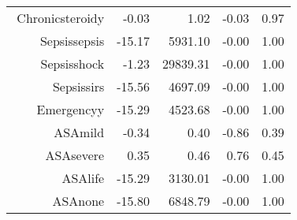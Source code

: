 \begin{tabular}{rrrrr}
$$  Chronic\-steroid\-y & -0.03 & 1.02 & -0.03 & 0.97 \\ 
  Sepsis\-sepsis & -15.17 & 5931.10 & -0.00 & 1.00 \\ 
  Sepsis\-shock & -1.23 & 29839.31 & -0.00 & 1.00 \\ 
  Sepsis\-sirs & -15.56 & 4697.09 & -0.00 & 1.00 \\ 
  Emergency\-y & -15.29 & 4523.68 & -0.00 & 1.00 \\ 
  ASA\-mild & -0.34 & 0.40 & -0.86 & 0.39 \\ 
  ASA\-severe & 0.35 & 0.46 & 0.76 & 0.45 \\ 
  ASA\-life & -15.29 & 3130.01 & -0.00 & 1.00 \\ 
  ASA\-none & -15.80 & 6848.79 & -0.00 & 1.00 \\ 
   \hline
\end{tabular}

